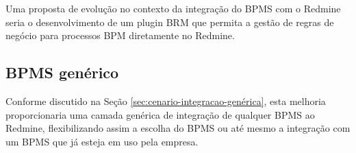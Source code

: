 Uma proposta de evolução no contexto da integração do BPMS com o Redmine seria o desenvolvimento de um plugin BRM que permita a gestão de regras de negócio para processos BPM diretamente no Redmine.

\subsection{BPMS genérico}

Conforme discutido na Seção \ref{sec:cenario-integracao-genérica}, esta melhoria proporcionaria uma camada genérica de integração de qualquer BPMS ao Redmine, flexibilizando assim a escolha do BPMS ou até mesmo a integração com um BPMS que já esteja em uso pela empresa. 
